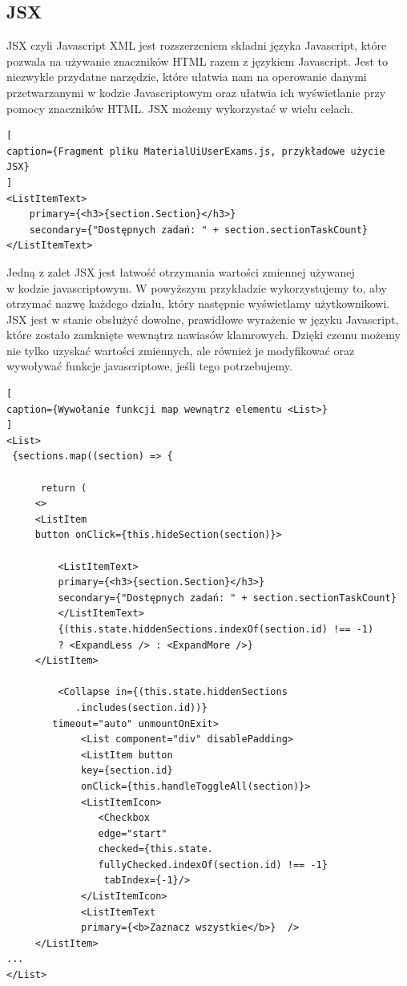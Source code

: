 \documentclass[oneside,polski,logo,indent]{amuthesis}
\begin{document}
\subsection{JSX}

{
JSX czyli Javascript XML jest rozszerzeniem składni języka Javascript, które pozwala na używanie znaczników HTML razem z językiem Javascript. Jest to niezwykle przydatne narzędzie, które ułatwia nam na operowanie danymi przetwarzanymi w kodzie Javascriptowym oraz ułatwia ich wyświetlanie przy pomocy znaczników HTML. JSX możemy wykorzystać w wielu celach.



\begin{lstlisting}[
caption={Fragment pliku MaterialUiUserExams.js, przykładowe użycie JSX}
]
<ListItemText>
	primary={<h3>{section.Section}</h3>}
	secondary={"Dostępnych zadań: " + section.sectionTaskCount}
</ListItemText>
\end{lstlisting}



Jedną z zalet JSX jest łatwość otrzymania wartości zmiennej używanej \\w kodzie javascriptowym. W powyższym przykładzie wykorzystujemy to, aby otrzymać nazwę każdego działu, który następnie wyświetlamy użytkownikowi.
JSX jest w stanie obsłużyć dowolne, prawidłowe wyrażenie w języku Javascript, które zostało zamknięte wewnątrz nawiasów klamrowych. Dzięki czemu możemy nie tylko uzyskać wartości zmiennych, ale również je modyfikować oraz wywoływać funkcje javascriptowe, jeśli tego potrzebujemy.



\begin{lstlisting}[
caption={Wywołanie funkcji map wewnątrz elementu <List>}
]
<List>
 {sections.map((section) => {
                     
	  return (
	 <>
	 <ListItem
	 button onClick={this.hideSection(section)}>

		 <ListItemText>
		 primary={<h3>{section.Section}</h3>}
		 secondary={"Dostępnych zadań: " + section.sectionTaskCount}
		 </ListItemText>
		 {(this.state.hiddenSections.indexOf(section.id) !== -1)
		 ? <ExpandLess /> : <ExpandMore />}
	 </ListItem>

		 <Collapse in={(this.state.hiddenSections
			.includes(section.id))} 
		timeout="auto" unmountOnExit>
			 <List component="div" disablePadding>
			 <ListItem button
			 key={section.id}
			 onClick={this.handleToggleAll(section)}>
			 <ListItemIcon>
			 	<Checkbox
			 	edge="start"
			 	checked={this.state.
				fullyChecked.indexOf(section.id) !== -1}
				 tabIndex={-1}/>
			 </ListItemIcon>
			 <ListItemText 
			 primary={<b>Zaznacz wszystkie</b>}  />
	 </ListItem>
...
</List>
\end{lstlisting}



}
\end{document}
